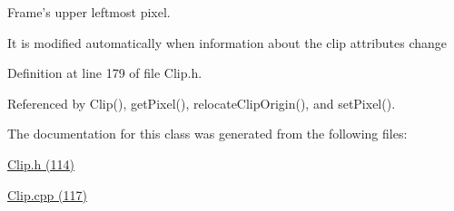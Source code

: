 Frame's upper leftmost pixel. 

It is modified automatically when information about the clip attributes change 

Definition at line 179 of file Clip.h.

Referenced by Clip(), getPixel(), relocateClipOrigin(), and setPixel().

The documentation for this class was generated from the following files:\begin{CompactItemize}
\item 
\hyperlink{_clip_8h}{Clip.h (114)}\item 
\hyperlink{_clip_8cpp}{Clip.cpp (117)}\end{CompactItemize}

